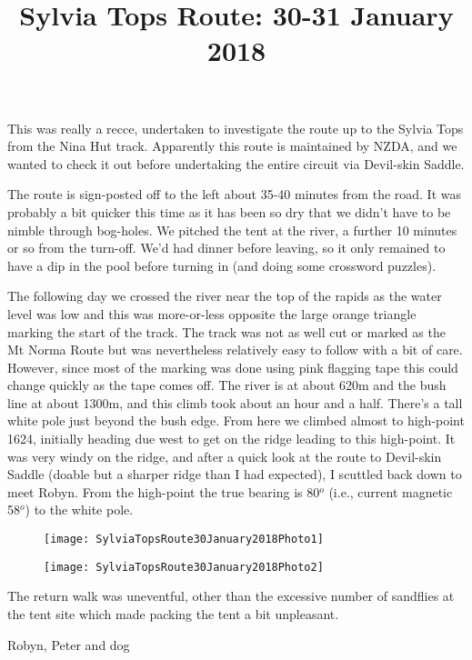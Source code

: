 \documentclass[12pt]{article} %
\title{Sylvia Tops Route: 30-31 January 2018}
\makeatletter
\renewcommand{\maketitle}{%
  {\bfseries{\scshape{\Large{\@title\par}}}}
}
\makeatother
\begin{document}
  \maketitle
This was really a recce, undertaken to investigate the route up to the Sylvia Tops from the Nina Hut track.  Apparently this route is maintained by NZDA, and we wanted to check it out before undertaking the entire circuit via Devil-skin Saddle.

The route is sign-posted off to the left about 35-40 minutes from the road.  It was probably a bit quicker this time as it has been so dry that we didn't have to be nimble through bog-holes.  We pitched the tent at the river, a further 10 minutes or so from the turn-off.  We'd had dinner before leaving, so it only remained to have a dip in the pool before turning in (and doing some crossword puzzles).

The following day we crossed the river near the top of the rapids as the water level was low and this was more-or-less opposite the large orange triangle marking the start of the track.  The track was not as well cut or marked as the Mt Norma Route but was nevertheless relatively easy to follow with a bit of care.  However, since most of the marking was done using pink flagging tape this could change quickly as the tape comes off.  The river is at about 620m and the bush line at about 1300m, and this climb took about an hour and a half.  There's a tall white pole just beyond the bush edge.  From here we climbed almost to high-point 1624, initially heading due west to get on the ridge leading to this high-point.  It was very windy on the ridge, and after a quick look at the route to Devil-skin Saddle (doable but a sharper ridge than I had expected), I scuttled back down to meet Robyn.  From the high-point the true bearing is 80$^o$ (i.e., current magnetic 58$^o$) to the white pole.

\begin{figure}[ht]
\begin{minipage}{.5\linewidth}
\begin{flushleft}
   \texttt{[image: SylviaTopsRoute30January2018Photo1]}
\end{flushleft}
\end{minipage}
\begin{minipage}{.5\linewidth}
\begin{flushright}
    \texttt{[image: SylviaTopsRoute30January2018Photo2]}
\end{flushright}
\end{minipage}
\end{figure}
 
The return walk was uneventful, other than the excessive number of sandflies at the tent site which made packing the tent a bit unpleasant.

\begin{flushright}
Robyn, Peter and dog
\end{flushright}
\end{document}

